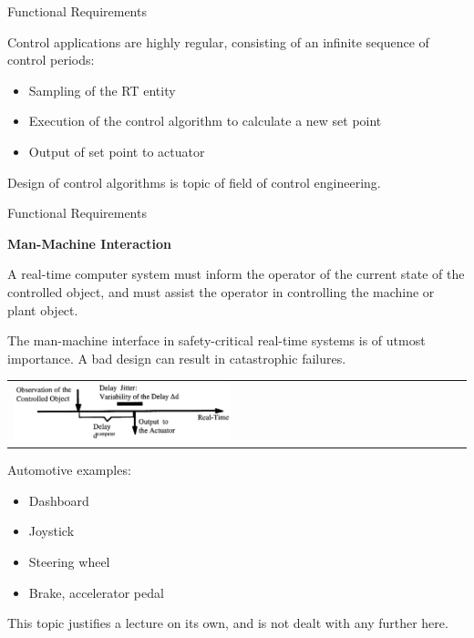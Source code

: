 \begin{frame}{Functional Requirements}

Control applications are highly regular, consisting of an infinite
sequence of control periods:

\begin{itemize}
\item
  Sampling of the RT entity
\item
  Execution of the control algorithm to calculate a new set point
\item
  Output of set point to actuator
\end{itemize}

Design of control algorithms is topic of field of control engineering.

\end{frame}

\begin{frame}{Functional Requirements}

\textbf{Man-Machine Interaction}
\newline

A real-time computer system must inform the operator of the current
state of the controlled object, and must assist the operator in
controlling the machine or plant object.

The man-machine interface in safety-critical real-time systems is of
utmost importance. A bad design can result in catastrophic failures.

\begin{longtable}[c]{@{}ll@{}}
\includegraphics[width=0.5\textwidth]{media/Fig_1_5.png}
\end{longtable}

Automotive examples:
\begin{itemize}
\item
  Dashboard
\item
  Joystick
\item
  Steering wheel
\item
  Brake, accelerator pedal
\end{itemize}

This topic justifies a lecture on its own, and is not dealt with any
further here.\tabularnewline

\end{frame}

